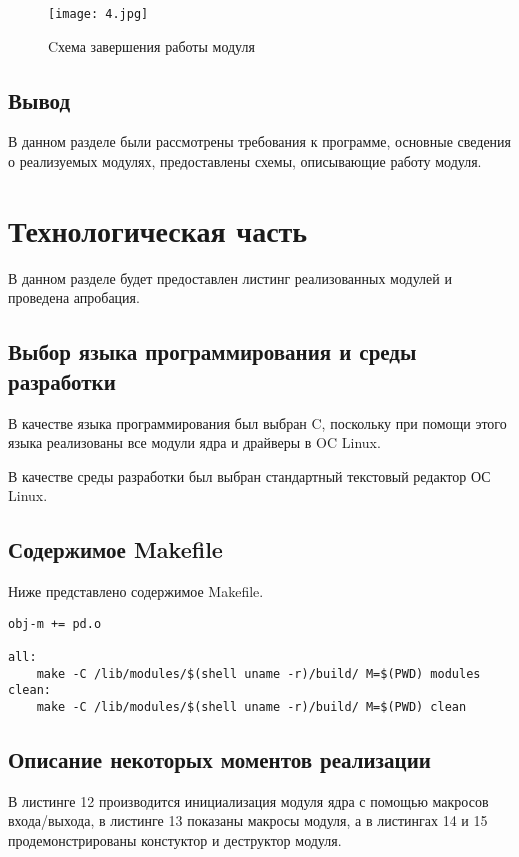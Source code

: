 \newpage
\begin{figure}[h!]\center 
	\caption{Cхема завершения работы модуля}
	\texttt{[image: 4.jpg]}
\end{figure}

\subsection*{Вывод}
В данном разделе были рассмотрены требования к программе, основные сведения о реализуемых модулях, предоставлены схемы, описывающие работу модуля.

\section*{Технологическая часть}
В данном разделе будет предоставлен листинг реализованных модулей и проведена апробация.
\subsection*{Выбор языка программирования и среды разработки}
В качестве языка программирования был выбран C, поскольку при помощи этого языка реализованы все модули ядра и драйверы в OC Linux.

В качестве среды разработки был выбран стандартный текстовый редактор ОС Linux.

\subsection*{Содержимое Makefile}
Ниже представлено содержимое Makefile.
\begin{lstlisting}[caption = Содержимое Makefile]
obj-m += pd.o

all:
	make -C /lib/modules/$(shell uname -r)/build/ M=$(PWD) modules
clean:
	make -C /lib/modules/$(shell uname -r)/build/ M=$(PWD) clean\end{lstlisting}
	
\subsection*{Описание некоторых моментов реализации}
В листинге 12 производится инициализация модуля ядра с помощью макросов входа/выхода, в листинге 13 показаны макросы модуля, а в листингах 14 и 15 продемонстрированы констуктор и деструктор модуля.


